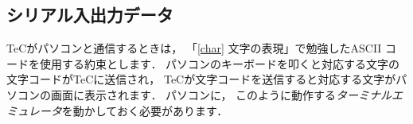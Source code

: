 \begin{center}
\end{center}

\subsection{シリアル入出力データ}
TeCがパソコンと通信するときは，
「\ref{char} 文字の表現」で勉強したASCII コードを使用する約束とします．
パソコンのキーボードを叩くと対応する文字の文字コードがTeCに送信され，
TeCが文字コードを送信すると対応する文字がパソコンの画面に表示されます．
パソコンに，
このように動作する\emph{ターミナルエミュレータ}を動かしておく必要があります．

\newpage
